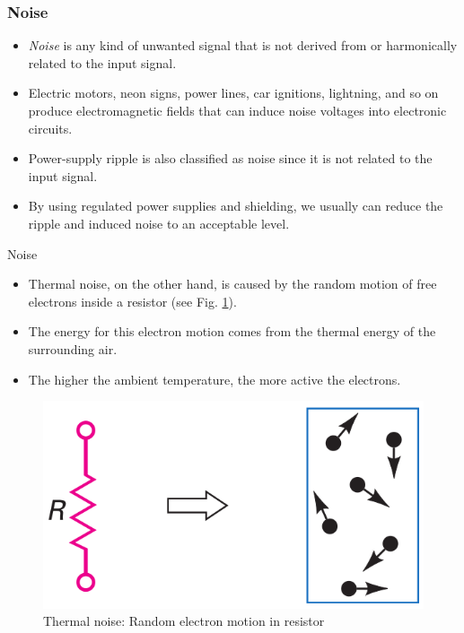 \documentclass[pdflatex,compress]{beamer}
\begin{document}
\begin{frame}
	\frametitle{Noise}
	\begin{itemize}
		\item \textit{Noise} is any kind of unwanted signal that is not derived from or harmonically related to the input signal.
		\item Electric motors, neon signs, power lines, car ignitions, lightning, and so on produce electromagnetic fields that can induce noise voltages into electronic circuits.
		\item Power-supply ripple is also classified as noise since it is not related to the input signal. 
		\item By using regulated power supplies and shielding, we usually can reduce the ripple and induced noise to an acceptable level.
	\end{itemize}
\end{frame}

\begin{frame}{Noise}
	\begin{multicols}{2}
		\begin{itemize}
			\item Thermal noise, on the other hand, is caused by the random motion of free electrons inside a resistor (see Fig. \ref{fig:2016a}).
			\item The energy for this electron motion comes from the thermal energy of the surrounding air.
			\item The higher the ambient temperature, the more active the electrons.
		\end{itemize}
		\vfill\null
		\columnbreak
		\begin{figure}
			\centering
			\includegraphics[width=\linewidth]{img/2016a}
			\caption{Thermal noise: Random electron motion in resistor}
			\label{fig:2016a}
		\end{figure}
	\end{multicols}
\end{frame}
\end{document}

